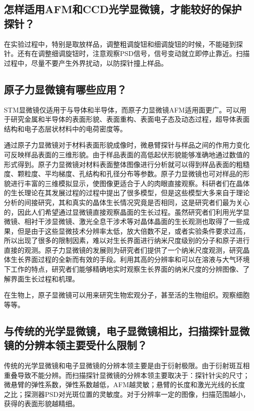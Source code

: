 \documentclass[a4paper]{article}
\begin{document}
\subsection{怎样适用AFM和CCD光学显微镜，才能较好的保护探针？}
在实验过程中，特别是取放样品，调整粗调旋钮和细调旋钮的时候，不能碰到探针。还有在调整细调旋钮时，注意观察PSD信号，信号变动就立即停止靠近。扫描过程中，尽量不要产生外界扰动，以防探针撞上样品。
\subsection{原子力显微镜有哪些应用？}
STM显微镜仅适用于与导体和半导体，而原子力显微镜AFM适用面更广。可以用于研究金属和半导体的表面形貌、表面重构、表面电子态及动态过程，超导体表面结构和电子态层状材料中的电荷密度等。

通过原子力显微镜对于材料表面形貌成像时，微悬臂探针与样品之间的作用力变化可反映样品表面的三维形貌。由于样品表面的高低起伏形貌能够准确地通过数值的形式得到。原子力显微镜对材料表面整体图像进行分析就可以得到样品表面的粗糙度、颗粒度、平均梯度、孔结构和孔径分布等参数。原子力显微镜也可对样品的形貌进行丰富的三维模拟显示，使图像更适合于人的肉眼直接观察。科研者们在晶体的生长理论在其发展过程的过程中提出了很多模型，但是这些模型大多来自于理论分析的间接研究，其和真实的晶体生长情况究竟是否相同，这是研究者们最为关心的，因此人们希望通过显微镜直接观察晶面的生长过程。虽然研究者们利用光学显微镜、相衬干涉显微镜、激光全息干涉术等对晶体晶面的生长观测也取得了一些成果，但是由于这些显微技术分辨率太低，放大倍数不足，或者实验条件要求过高，所以出现了很多的限制因素，难以对生长界面进行纳米尺度级别的分子和原子进行直接的观测。原子力显微镜的发展则为研究者们提供了一个纳米尺度观测，研究晶体生长界面过程的全新而有效的手段。利用其高的分辨率和可以在溶液与大气环境下工作的特点，研究者们能够精确地实时观察生长界面的纳米尺度的分辨图像、了解界面生长过程和机理。

在生物上，原子显微镜可以用来研究生物宏观分子，甚至活的生物组织。观察细胞等等。
\subsection{与传统的光学显微镜，电子显微镜相比，扫描探针显微镜的分辨本领主要受什么限制？}
传统的光学显微镜和电子显微镜的分辨本领主要是由于衍射极限。由于衍射斑互相重叠导致不能分辨。而扫描探针显微镜的分辨本领主要取决于：探针针尖的尺寸；微悬臂的弹性系数，弹性系数越低，AFM越灵敏；悬臂的长度和激光光线的长度之比；探测器PSD对光斑位置的灵敏度。对于分辨率一定的图像，扫描范围越小，获得的表面形貌越精细。
\end{document}
